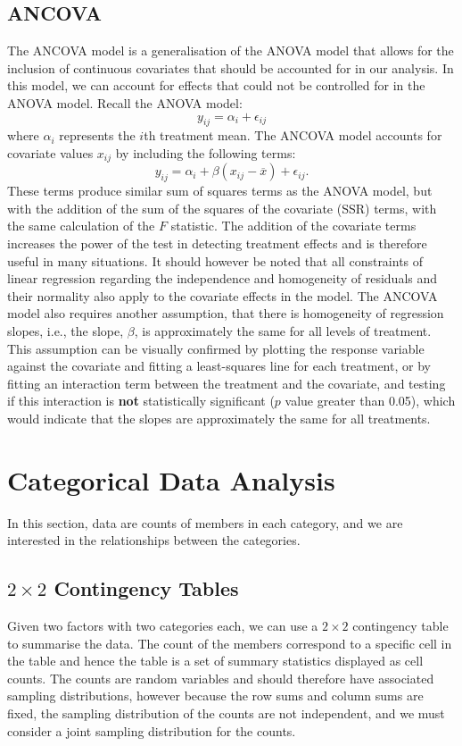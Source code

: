 \documentclass{article}
\begin{document}
\subsection{ANCOVA}
The ANCOVA model is a generalisation of the ANOVA model that allows for
the inclusion of continuous covariates that should be accounted for in
our analysis. In this model, we can account for effects that could not
be controlled for in the ANOVA model. Recall the ANOVA model:
\begin{equation*}
    y_{ij} = \alpha_i + \epsilon_{ij}
\end{equation*}
where \(\alpha_i\) represents the \(i\)th treatment mean. The ANCOVA model accounts for covariate values \(x_{ij}\)
by including the following terms:
\begin{equation*}
    y_{ij} = \alpha_i + \beta\left( x_{ij} - \overline{x} \right) + \epsilon_{ij}.
\end{equation*}
These terms produce similar sum of squares terms as the ANOVA model, but with the addition of the
sum of the squares of the covariate (SSR) terms, with the same calculation of the \(F\) statistic. The addition of the covariate terms increases the power of the test in
detecting treatment effects and is therefore useful in many situations.
It should however be noted that all constraints of linear regression
regarding the independence and homogeneity of residuals and their
normality also apply to the covariate effects in the model. The ANCOVA model also requires another assumption, that there is
homogeneity of regression slopes, i.e., the slope, \(\beta\), is
approximately the same for all levels of treatment. This assumption can
be visually confirmed by plotting the response variable against the
covariate and fitting a least-squares line for each treatment, or by
fitting an interaction term between the treatment and the covariate,
and testing if this interaction is \textbf{not} statistically
significant (\(p\) value greater than 0.05), which would indicate that
the slopes are approximately the same for all treatments.
\section{Categorical Data Analysis}
In this section, data are counts of members in each category, and we
are interested in the relationships between the categories.
\subsection{\texorpdfstring{\(2 \times 2\)}{2x2} Contingency Tables}
Given two factors with two categories each, we can use a \(2 \times 2\) contingency table to summarise the data.
The count of the members correspond to a specific cell in the table and hence the table is a set of summary statistics displayed
as cell counts. The counts are random variables and should therefore have associated
sampling distributions, however because the row sums and column sums
are fixed, the sampling distribution of the counts are not independent,
and we must consider a joint sampling distribution for the counts.
\end{document}
